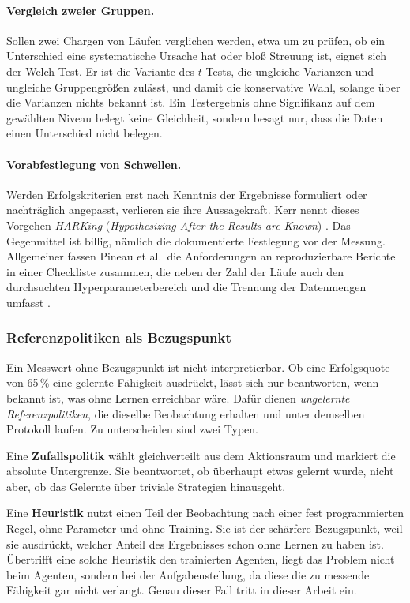 \documentclass[11pt,a4paper]{article}
\begin{document}
\paragraph{Vergleich zweier Gruppen.}
Sollen zwei Chargen von Läufen verglichen werden, etwa um zu prüfen, ob ein
Unterschied eine systematische Ursache hat oder bloß Streuung ist, eignet sich
der Welch-Test. Er ist die Variante des $t$-Tests, die ungleiche Varianzen und
ungleiche Gruppengrößen zulässt, und damit die konservative Wahl, solange über
die Varianzen nichts bekannt ist. Ein Testergebnis ohne Signifikanz auf dem
gewählten Niveau belegt keine Gleichheit, sondern besagt nur, dass die Daten
einen Unterschied nicht belegen.

\paragraph{Vorabfestlegung von Schwellen.}
Werden Erfolgskriterien erst nach Kenntnis der Ergebnisse formuliert oder
nachträglich angepasst, verlieren sie ihre Aussagekraft. Kerr nennt dieses
Vorgehen \emph{HARKing} (\emph{Hypothesizing After the Results are Known})
\cite{kerr1998harking}. Das Gegenmittel ist billig, nämlich die dokumentierte
Festlegung vor der Messung. Allgemeiner fassen Pineau et al.\ die Anforderungen an reproduzierbare Berichte
in einer Checkliste zusammen, die neben der Zahl der Läufe auch den
durchsuchten Hyperparameterbereich und die Trennung der Datenmengen umfasst
\cite{pineau2021repro}.

\subsubsection{Referenzpolitiken als Bezugspunkt}
\label{sec:g_baselines}

Ein Messwert ohne Bezugspunkt ist nicht interpretierbar. Ob eine Erfolgsquote
von 65\,\% eine gelernte Fähigkeit ausdrückt, lässt sich nur beantworten, wenn
bekannt ist, was ohne Lernen erreichbar wäre. Dafür dienen \emph{ungelernte
Referenzpolitiken}, die dieselbe Beobachtung erhalten und unter demselben
Protokoll laufen. Zu unterscheiden sind zwei Typen.

Eine \textbf{Zufallspolitik} wählt gleichverteilt aus dem Aktionsraum und
markiert die absolute Untergrenze. Sie beantwortet, ob überhaupt etwas gelernt
wurde, nicht aber, ob das Gelernte über triviale Strategien hinausgeht.

Eine \textbf{Heuristik} nutzt einen Teil der Beobachtung nach einer fest
programmierten Regel, ohne Parameter und ohne Training. Sie ist der schärfere
Bezugspunkt, weil sie ausdrückt, welcher Anteil des Ergebnisses schon ohne
Lernen zu haben ist. Übertrifft eine solche Heuristik den trainierten Agenten,
liegt das Problem nicht beim Agenten, sondern bei der Aufgabenstellung, da diese
die zu messende Fähigkeit gar nicht verlangt. Genau dieser Fall tritt in dieser
Arbeit ein.
\end{document}
